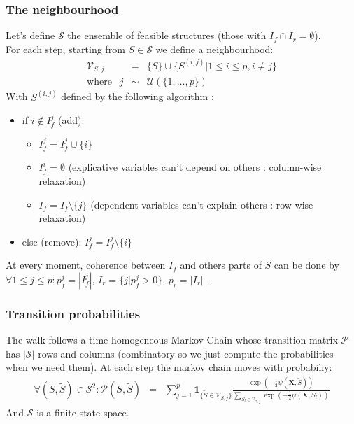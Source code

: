 \documentclass[11pt,a4paper]{article}
\begin{document}
	\subsubsection{The neighbourhood}
	Let's define $\mathcal{S}$ the ensemble of feasible structures (those with $I_f\cap I_r=\emptyset$).
	\\
	For each step, starting from $S \in \mathcal{S}$ we define a neighbourhood:
		\begin{eqnarray}
		\mathcal{V}_{S,j}&=& \{S \}\cup \{ S^{(i,j)} |1\leq i \leq p, i\neq j  \} \\
		\textrm{where }\ \ j &\sim & \mathcal{U}(\{1,\dots,p\}) 
	\end{eqnarray}	
	With $S^{(i,j)}$ defined by the following algorithm :
	\begin{itemize}
		\item if $i \notin I_f^j$ (add): 
			\begin{itemize}
				\item $I_f^j=I_f^j\cup \{i\}$
				\item $I_f^i=\emptyset$ (explicative variables can't depend on others : column-wise relaxation)
				\item $I_f=I_f \setminus \{j\}$ (dependent variables can't explain others : row-wise relaxation) 
			\end{itemize}			 
		\item else (remove): $I_f^j=I_f^j\setminus \{i\}$
	\end{itemize}
	
	\smallskip
	At every moment, coherence between $I_f$ and others parts of $S$ can be done by $\forall 1\leq j\leq p :  p_f^j=|I_f^j|$, $I_r=\{j |p_f^j>0 \}$, $p_r= |I_r|$ .
		
	\subsubsection{Transition probabilities}
	
	The walk follows a time-homogeneous Markov Chain whose transition matrix $\mathcal{P}$ has $|\mathcal{S}|$ rows and columns (combinatory so we just compute the probabilities when we need them).
	At each step the markov chain moves with probabiliy:
	\begin{eqnarray}
			\forall (S,\tilde{S}) \in \mathcal{S}^2 : \mathcal{P}(S,\tilde{S})&=&\sum_{j=1}^p \mathbf{1}_{ \{\tilde{S}\in \mathcal{V}_{S,j}\} }\frac{\exp(-\frac{1}{2}\psi(\boldsymbol{X},\tilde{S}))}{\sum_{S_l\in \mathcal{V}_{S,j}}\exp(-\frac{1}{2}\psi(\boldsymbol{X},S_l))} 
	\end{eqnarray}
	And $\mathcal{S}$ is a finite state space.%
	 
\end{document}
